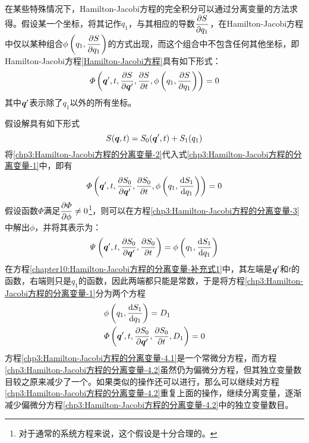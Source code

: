 在某些特殊情况下，Hamilton-Jacobi方程的完全积分可以通过分离变量的方法求得。假设某一个坐标，将其记作$q_1$，与其相应的导数$\dfrac{\partial S}{\partial q_1}$，在Hamilton-Jacobi方程中仅以某种组合$\phi\left(q_1,\dfrac{\partial S}{\partial q_1}\right)$的方式出现，而这个组合中不包含任何其他坐标，即Hamilton-Jacobi方程\eqref{Hamilton-Jacobi方程}具有如下形式：
\begin{equation}
	\varPhi\left(\boldsymbol{q}',t,\frac{\partial S}{\partial \boldsymbol{q}'},\frac{\partial S}{\partial t},\phi\left(q_1,\dfrac{\partial S}{\partial q_1}\right)\right) = 0
	\label{chp3:Hamilton-Jacobi方程的分离变量-1}
\end{equation}
其中$\boldsymbol{q}'$表示除了$q_1$以外的所有坐标。

假设解具有如下形式
\begin{equation}
	S(\boldsymbol{q},t) = S_0(\boldsymbol{q}',t)+S_1(q_1)
	\label{chp3:Hamilton-Jacobi方程的分离变量-2}
\end{equation}
将\eqref{chp3:Hamilton-Jacobi方程的分离变量-2}代入式\eqref{chp3:Hamilton-Jacobi方程的分离变量-1}中，即有
\begin{equation}
	\varPhi\left(\boldsymbol{q}',t,\frac{\partial S_0}{\partial \boldsymbol{q}'},\frac{\partial S_0}{\partial t},\phi\left(q_1,\dfrac{\mathrm{d} S_1}{\mathrm{d} q_1}\right)\right) = 0
	\label{chp3:Hamilton-Jacobi方程的分离变量-3}
\end{equation}
假设函数$\varPhi$满足$\dfrac{\partial \varPhi}{\partial \phi} \neq 0$\footnote{对于通常的系统方程来说，这个假设是十分合理的。}，则可以在方程\eqref{chp3:Hamilton-Jacobi方程的分离变量-3}中解出$\phi$，并将其表示为：
\begin{equation}
	\varPsi\left(\boldsymbol{q}',t,\frac{\partial S_0}{\partial \boldsymbol{q}'},\frac{\partial S_0}{\partial t}\right) = \phi\left(q_1,\dfrac{\mathrm{d} S_1}{\mathrm{d} q_1}\right)
	\label{chapter10:Hamilton-Jacobi方程的分离变量-补充式1}
\end{equation}
在方程\eqref{chapter10:Hamilton-Jacobi方程的分离变量-补充式1}中，其左端是$\boldsymbol{q}'$和$t$的函数，右端则只是$q_1$的函数，因此两端都只能是常数，于是将方程\eqref{chp3:Hamilton-Jacobi方程的分离变量-1}分为两个方程
\begin{align}
	& \phi\left(q_1,\dfrac{\mathrm{d} S_1}{\mathrm{d} q_1}\right) = D_1 \label{chp3:Hamilton-Jacobi方程的分离变量-4.1} \\
	& \varPhi\left(\boldsymbol{q}',t,\frac{\partial S_0}{\partial \boldsymbol{q}'},\frac{\partial S_0}{\partial t},D_1\right) = 0 \label{chp3:Hamilton-Jacobi方程的分离变量-4.2}
\end{align}
方程\eqref{chp3:Hamilton-Jacobi方程的分离变量-4.1}是一个常微分方程，而方程\eqref{chp3:Hamilton-Jacobi方程的分离变量-4.2}虽然仍为偏微分方程，但其独立变量数目较之原来减少了一个。如果类似的操作还可以进行，那么可以继续对方程\eqref{chp3:Hamilton-Jacobi方程的分离变量-4.2}重复上面的操作，继续分离变量，逐渐减少偏微分方程\eqref{chp3:Hamilton-Jacobi方程的分离变量-4.2}中的独立变量数目。

